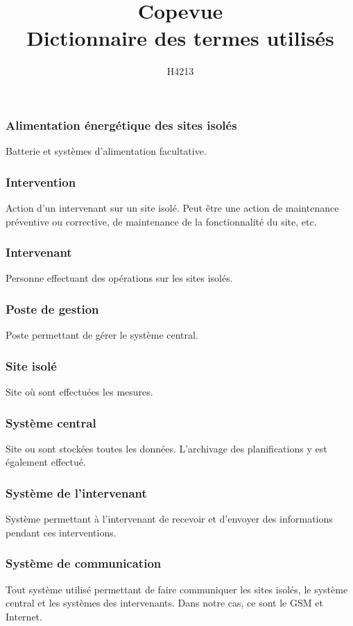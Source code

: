 \documentclass[a4paper]{report}
\author{H4213}
\title{Copevue\\Dictionnaire des termes utilisés}
\begin{document}
\maketitle

\subsubsection{Alimentation énergétique des sites isolés}
Batterie et systèmes d'alimentation facultative.

\subsubsection{Intervention}
Action d'un intervenant sur un site isolé. Peut être une action de
maintenance préventive ou corrective, de maintenance de la
fonctionnalité du site, etc.

\subsubsection{Intervenant}
Personne effectuant des opérations sur les sites isolés.

\subsubsection{Poste de gestion}
Poste permettant de gérer le système central.

\subsubsection{Site isolé}
Site où sont effectuées les mesures.

\subsubsection{Système central}
Site ou sont stockées toutes les données. L'archivage des
planifications y est également effectué.

\subsubsection{Système de l'intervenant}
Système permettant à l'intervenant de recevoir et d'envoyer des informations pendant ces interventions.

\subsubsection{Système de communication}
Tout système utilisé permettant de faire communiquer les sites isolés,
le système central et les systèmes des intervenants. Dans notre cas,
ce sont le GSM et Internet.
\end{document}
